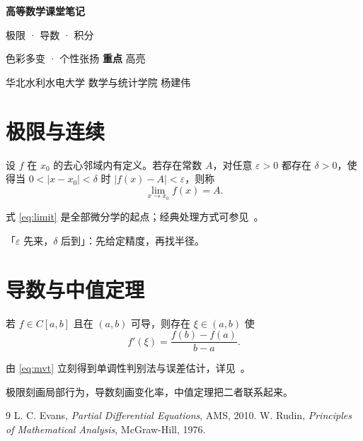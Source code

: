 \documentclass[11pt,a4paper]{article}
\newcommand{\keyw}[1]{\colorbox{cYellowL}{\textbf{\color{cOrange}#1}}}
\newcommand{\hl}[1]{\colorbox{cYellow!40}{#1}}
\begin{document}
\begin{titlepage}
\thispagestyle{empty}
\centering
\vspace*{2.4cm}
{\sffamily\bfseries\fontsize{30}{38}\selectfont\color{cBlue} 高等数学课堂笔记\par}
\vspace{0.6cm}
{\large\color{cPurple} 极限 · 导数 · 积分\par}
\vspace{1.2cm}
\begin{tcolorbox}[enhanced,width=0.72\textwidth,colback=cYellowL,colframe=cOrange,
  arc=6pt,boxrule=0.8pt,drop fuzzy shadow=cYellow!60]
\centering 色彩多变 · 个性张扬 \quad\keyw{重点} \quad \hl{高亮}
\end{tcolorbox}
\vspace{1.4cm}
{\small 华北水利水电大学 \quad 数学与统计学院 \quad 杨建伟\par}
\end{titlepage}

\tableofcontents
\clearpage

\section{极限与连续}

\begin{defbox}[函数极限]
设 $f$ 在 $x_0$ 的去心邻域内有定义。若存在常数 $A$，对任意
$\varepsilon>0$ 都存在 $\delta>0$，使得当 $0<\lvert x-x_0\rvert<\delta$ 时
$\lvert f(x)-A\rvert<\varepsilon$，则称
\begin{equation}\label{eq:limit}
  \lim_{x\to x_0}f(x)=A .
\end{equation}
\end{defbox}

式 \eqref{eq:limit} 是全部微分学的起点；经典处理方式可参见~\cite{Evans,Rudin}。

\begin{tipbox}[记忆口诀]
「$\varepsilon$ 先来，$\delta$ 后到」：先给定精度，再找半径。
\end{tipbox}

\section{导数与中值定理}

\begin{thmbox}[拉格朗日中值定理]
若 $f\in C[a,b]$ 且在 $(a,b)$ 可导，则存在 $\xi\in(a,b)$ 使
\begin{equation}\label{eq:mvt}
  f'(\xi)=\frac{f(b)-f(a)}{b-a} .
\end{equation}
\end{thmbox}

由 \eqref{eq:mvt} 立刻得到单调性判别法与误差估计，详见~\cite{Rudin}。

\begin{sumbox}[本节小结]
极限刻画局部行为，导数刻画变化率，中值定理把二者联系起来。
\end{sumbox}

\begin{thebibliography}{9}
 L. C. Evans, \emph{Partial Differential Equations}, AMS, 2010.
 W. Rudin, \emph{Principles of Mathematical Analysis},
  McGraw-Hill, 1976.
\end{thebibliography}
\end{document}
